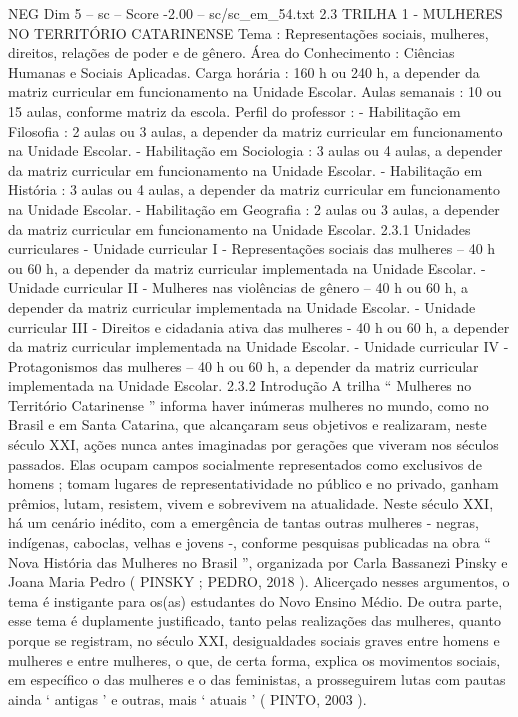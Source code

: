 \begin{textsample}{NEG Dim 5 – sc – Score -2.00 – sc/sc\_em\_54.txt}  \label{ex:f5_neg_252}
2.3 TRILHA 1 - MULHERES NO TERRITÓRIO CATARINENSE Tema : Representações sociais, mulheres, direitos, relações de poder e de gênero.
Área do Conhecimento : Ciências Humanas e Sociais Aplicadas.
Carga horária : 160 h ou 240 h, a depender da matriz curricular em funcionamento na Unidade Escolar.
Aulas semanais : 10 ou 15 aulas, conforme matriz da escola.
Perfil do professor : - Habilitação em Filosofia : 2 aulas ou 3 aulas, a depender da matriz curricular em funcionamento na Unidade Escolar. - Habilitação em Sociologia : 3 aulas ou 4 aulas, a depender da matriz curricular em funcionamento na Unidade Escolar. - Habilitação em História : 3 aulas ou 4 aulas, a depender da matriz curricular em funcionamento na Unidade Escolar. - Habilitação em Geografia : 2 aulas ou 3 aulas, a depender da matriz curricular em funcionamento na Unidade Escolar. 2.3.1 Unidades curriculares - Unidade curricular I - Representações sociais das mulheres – 40 h ou 60 h, a depender da matriz curricular implementada na Unidade Escolar. - Unidade curricular II - Mulheres nas violências de gênero – 40 h ou 60 h, a depender da matriz curricular implementada na Unidade Escolar. - Unidade curricular III - Direitos e cidadania ativa das mulheres - 40 h ou 60 h, a depender da matriz curricular implementada na Unidade Escolar. - Unidade curricular IV - Protagonismos das mulheres – 40 h ou 60 h, a depender da matriz curricular implementada na Unidade Escolar. 2.3.2 Introdução A trilha “ Mulheres no Território Catarinense ” informa haver inúmeras mulheres no mundo, como no Brasil e em Santa Catarina, que alcançaram seus objetivos e realizaram, neste século XXI, ações nunca antes imaginadas por gerações que viveram nos séculos passados.
Elas ocupam campos socialmente representados como exclusivos de homens ; tomam lugares de representatividade no público e no privado, ganham prêmios, lutam, resistem, vivem e sobrevivem na atualidade.
Neste século XXI, há um cenário inédito, com a emergência de tantas outras mulheres - negras, indígenas, caboclas, velhas e jovens -, conforme pesquisas publicadas na obra “ Nova História das Mulheres no Brasil ”, organizada por Carla Bassanezi Pinsky e Joana Maria Pedro ( PINSKY ; PEDRO, 2018 ).
Alicerçado nesses argumentos, o tema é instigante para os(as) estudantes do Novo Ensino Médio.
De outra parte, esse tema é duplamente justificado, tanto pelas realizações das mulheres, quanto porque se registram, no século XXI, desigualdades sociais graves entre homens e mulheres e entre mulheres, o que, de certa forma, explica os movimentos sociais, em específico o das mulheres e o das feministas, a prosseguirem lutas com pautas ainda ‘ antigas ’ e outras, mais ‘ atuais ’ ( PINTO, 2003 ).

\end{textsample}
